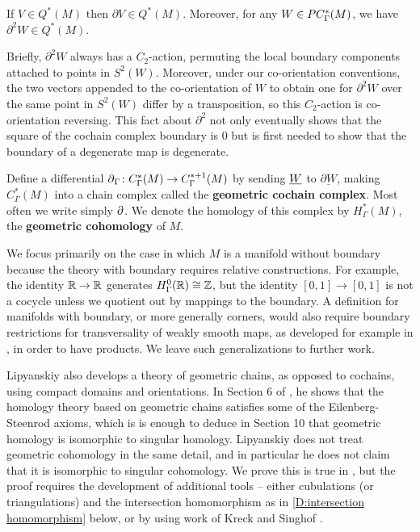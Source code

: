 \begin{proposition}
	If $V \in Q^*(M)$ then $\partial V \in Q^*(M)$.
	Moreover, for any $W \in PC_\Gamma^*(M)$, we have $\partial^2 W \in Q^*(M)$.
\end{proposition}


Briefly, $\partial^2 W$ always has a $C_2$-action, permuting the local boundary components attached to points in $S^2(W)$.
Moreover, under our co-orientation conventions, the two vectors appended to the co-orientation of $W$ to obtain one for $\partial^2 W$ over the same point in $S^2(W)$ differ by a transposition, so this $C_2$-action is co-orientation reversing.
This fact about $\partial^2$ not only eventually shows that the square of the cochain complex boundary is $0$ but is first needed to show that the boundary of a degenerate map is degenerate.

\begin{definition}
	Define a differential $\operatorname{\partial}_\Gamma \colon C_\Gamma^*(M) \to C_\Gamma^{*+1}(M)$ by sending $\underline{W}$ to $ \underline{\partial W}$, making $C_\Gamma^*(M)$ into a chain complex called the {\bf geometric cochain complex}.
	Most often we write simply $\operatorname{\partial}$.
	We denote the homology of this complex by $H^*_\Gamma(M)$, the \textbf{geometric cohomology} of $M$.
\end{definition}

We focus primarily on the case in which $M$ is a manifold without boundary because
the theory with boundary requires relative constructions.
For example, the identity $\mathbb{R}\to\mathbb{R}$ generates $H_\Gamma^0(\mathbb{R})\cong \mathbb{Z}$, but the identity $[0,1] \to [0,1]$ is not a cocycle unless we quotient out by mappings to the boundary.
A definition for manifolds with boundary, or more generally corners, would also require boundary restrictions for transversality of weakly smooth maps, as developed for example in \cite{Joy12}, in order to have products.
We leave such generalizations to further work.

Lipyanskiy also develops a theory of geometric chains, as opposed to cochains, using compact domains and orientations.
In Section 6 of \cite{Lipy14}, he shows that the homology theory based on geometric chains satisfies some of the Eilenberg-Steenrod axioms, which is is enough to deduce in Section 10 that geometric homology is isomorphic to singular homology.
Lipyanskiy does not treat geometric cohomology in the same detail, and in particular he does not claim that it is isomorphic to singular cohomology.
We prove this is true in \cite[Theorem 5.34 and Theorem 6.21]{medina2022foundations}, but the proof requires the development of additional tools -- either cubulations (or triangulations) and the
intersection homomorphism as in \cref{D:intersection homomorphism} below, or by using work of Kreck and Singhof \cite{Krec10, Krec10b}.

